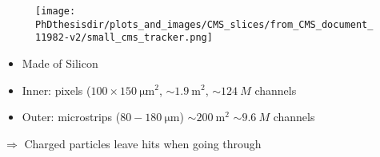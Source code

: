 \begin{frame}
\addtocounter{framenumber}{-1}
\begin{minipage}[t]{.6\textwidth}
\begin{figure}
\texttt{[image: \\PhDthesisdir/plots\_and\_images/CMS\_slices/from\_CMS\_document\_11982-v2/small\_cms\_tracker.png]}
\end{figure}
\end{minipage}
\hfill\begin{minipage}[t]{.35\textwidth}
\begin{block}{}
\begin{itemize}
\item Made of Silicon
\item Inner: pixels ($\num{100}\times\SI{150}{\micro\meter^2}$, $\sim\SI{1.9}{\meter^2}$, $\sim\SI{124}{M}$ channels
\item Outer: microstrips ($\num{80}-\SI{180}{\micro\meter}$) $\sim\SI{200}{\meter^2}$ $\sim\SI{9.6}{M}$ channels
\end{itemize}
\end{block}

\begin{block}{}
$\Rightarrow$ Charged particles leave hits when going through
\end{block}
\end{minipage}

\end{frame}

